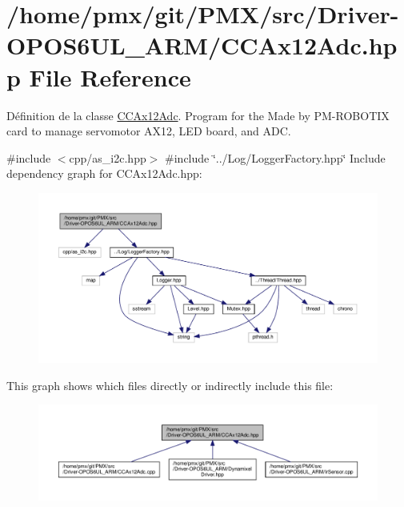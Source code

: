 \hypertarget{Driver-OPOS6UL__ARM_2CCAx12Adc_8hpp}{}\section{/home/pmx/git/\+P\+M\+X/src/\+Driver-\/\+O\+P\+O\+S6\+U\+L\+\_\+\+A\+R\+M/\+C\+C\+Ax12\+Adc.hpp File Reference}
\label{Driver-OPOS6UL__ARM_2CCAx12Adc_8hpp}


Définition de la classe \hyperlink{classCCAx12Adc}{C\+C\+Ax12\+Adc}. Program for the Made by P\+M-\/\+R\+O\+B\+O\+T\+IX card to manage servomotor A\+X12, L\+ED board, and A\+DC.  


{\ttfamily \#include $<$cpp/as\+\_\+i2c.\+hpp$>$}\newline
{\ttfamily \#include \char`\"{}../\+Log/\+Logger\+Factory.\+hpp\char`\"{}}\newline
Include dependency graph for C\+C\+Ax12\+Adc.\+hpp\+:
\nopagebreak
\begin{figure}[H]
\begin{center}
\leavevmode
\includegraphics[width=350pt]{Driver-OPOS6UL__ARM_2CCAx12Adc_8hpp__incl}
\end{center}
\end{figure}
This graph shows which files directly or indirectly include this file\+:
\nopagebreak
\begin{figure}[H]
\begin{center}
\leavevmode
\includegraphics[width=350pt]{Driver-OPOS6UL__ARM_2CCAx12Adc_8hpp__dep__incl}
\end{center}
\end{figure}

